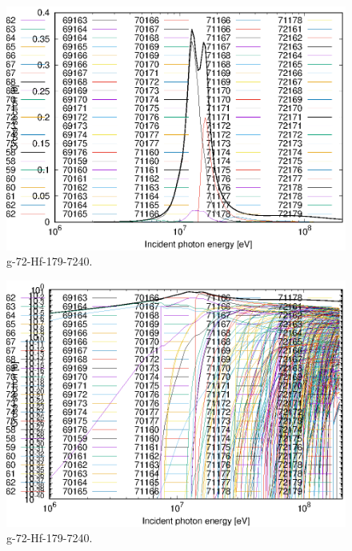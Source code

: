 \begin{figure}
 \includegraphics[width=\linewidth]{eps/g_72-Hf-179_7240.eps}
  \caption{g-72-Hf-179-7240.}
\end{figure}
\begin{figure}
 \includegraphics[width=\linewidth]{eps-log/g_72-Hf-179_7240.eps}
 \caption{g-72-Hf-179-7240.}
\end{figure}
\newpage \clearpage

